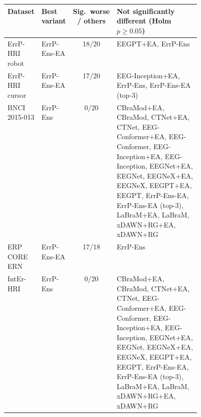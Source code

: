 \begin{tabular}{llcp{0.45\linewidth}}
\toprule
Dataset & Best variant & Sig.\ worse / others & Not significantly different (Holm $p\geq0.05$) \\
\midrule
ErrP-HRI robot & ErrP-Ens-EA & 18/20 & EEGPT+EA, ErrP-Ens \\
ErrP-HRI cursor & ErrP-Ens-EA & 17/20 & EEG-Inception+EA, ErrP-Ens, ErrP-Ens-EA (top-3) \\
BNCI 2015-013 & ErrP-Ens & 0/20 & CBraMod+EA, CBraMod, CTNet+EA, CTNet, EEG-Conformer+EA, EEG-Conformer, EEG-Inception+EA, EEG-Inception, EEGNet+EA, EEGNet, EEGNeX+EA, EEGNeX, EEGPT+EA, EEGPT, ErrP-Ens-EA, ErrP-Ens-EA (top-3), LaBraM+EA, LaBraM, xDAWN+RG+EA, xDAWN+RG \\
ERP CORE ERN & ErrP-Ens-EA & 17/18 & ErrP-Ens \\
IntEr-HRI & ErrP-Ens & 0/20 & CBraMod+EA, CBraMod, CTNet+EA, CTNet, EEG-Conformer+EA, EEG-Conformer, EEG-Inception+EA, EEG-Inception, EEGNet+EA, EEGNet, EEGNeX+EA, EEGNeX, EEGPT+EA, EEGPT, ErrP-Ens-EA, ErrP-Ens-EA (top-3), LaBraM+EA, LaBraM, xDAWN+RG+EA, xDAWN+RG \\
\bottomrule
\end{tabular}
